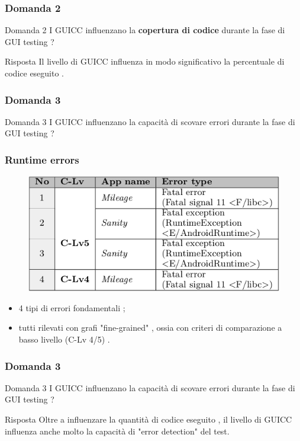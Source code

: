 \documentclass[12pt]{beamer}
\begin{document}
\begin{frame}
\frametitle{Domanda 2}
\begin{block}{Domanda 2}
    I GUICC influenzano la \textbf{copertura di codice} durante la fase di GUI testing  ? 
\end{block}

\begin{block}{Risposta}
Il livello di GUICC influenza in modo significativo la percentuale di codice eseguito .
\end{block}

\end{frame}



\begin{frame}
\frametitle{Domanda 3}

\begin{block}{Domanda 3}
I GUICC influenzano la capacit\`a di scovare errori durante la fase di GUI testing ?
\end{block}


\end{frame}

\begin{frame}
\frametitle{Runtime errors}
\begin{figure}
\includegraphics[width=0.8\linewidth]{images/errors.png}
\end{figure}

\begin{itemize}
\item 4 tipi di errori fondamentali ;
\item tutti rilevati con grafi "fine-grained" , ossia con criteri di comparazione a basso livello (C-Lv 4/5) .

\end{itemize}

\end{frame}

\begin{frame}
\frametitle{Domanda 3}

\begin{block}{Domanda 3}
I GUICC influenzano la capacit\`a di scovare errori durante la fase di GUI testing  ?
\end{block}

\begin{block}{Risposta}
Oltre a influenzare la quantit\`a di codice eseguito ,  il livello di GUICC influenza anche molto la capacit\`a di "error detection" del test.
\end{block}

\end{frame}
\end{document}
